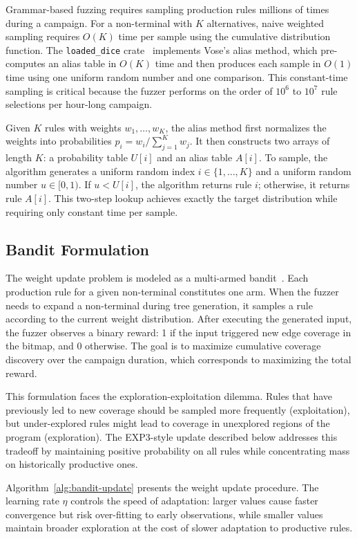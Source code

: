 Grammar-based fuzzing requires sampling production rules millions of times during a campaign. For a non-terminal with $K$ alternatives, naive weighted sampling requires $O(K)$ time per sample using the cumulative distribution function. The \texttt{loaded\_dice} crate~\cite{loadeddice} implements Vose's alias method, which pre-computes an alias table in $O(K)$ time and then produces each sample in $O(1)$ time using one uniform random number and one comparison. This constant-time sampling is critical because the fuzzer performs on the order of $10^6$ to $10^7$ rule selections per hour-long campaign.

Given $K$ rules with weights $w_1, \ldots, w_K$, the alias method first normalizes the weights into probabilities $p_i = w_i / \sum_{j=1}^{K} w_j$. It then constructs two arrays of length $K$: a probability table $U[i]$ and an alias table $A[i]$. To sample, the algorithm generates a uniform random index $i \in \{1, \ldots, K\}$ and a uniform random number $u \in [0, 1)$. If $u < U[i]$, the algorithm returns rule $i$; otherwise, it returns rule $A[i]$. This two-step lookup achieves exactly the target distribution while requiring only constant time per sample.

\subsection{Bandit Formulation}

The weight update problem is modeled as a multi-armed bandit~\cite{exp3}. Each production rule for a given non-terminal constitutes one arm. When the fuzzer needs to expand a non-terminal during tree generation, it samples a rule according to the current weight distribution. After executing the generated input, the fuzzer observes a binary reward: 1 if the input triggered new edge coverage in the bitmap, and 0 otherwise. The goal is to maximize cumulative coverage discovery over the campaign duration, which corresponds to maximizing the total reward.

This formulation faces the exploration-exploitation dilemma. Rules that have previously led to new coverage should be sampled more frequently (exploitation), but under-explored rules might lead to coverage in unexplored regions of the program (exploration). The EXP3-style update described below addresses this tradeoff by maintaining positive probability on all rules while concentrating mass on historically productive ones.

Algorithm~\ref{alg:bandit-update} presents the weight update procedure. The learning rate $\eta$ controls the speed of adaptation: larger values cause faster convergence but risk over-fitting to early observations, while smaller values maintain broader exploration at the cost of slower adaptation to productive rules.

